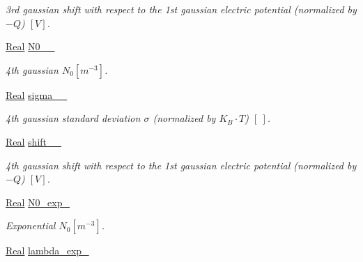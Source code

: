 \begin{DoxyCompactItemize}
\begin{DoxyCompactList}\small\item\em 3rd gaussian shift with respect to the 1st gaussian electric potential (normalized by $ -Q $) $ \left[ V \right] $. \end{DoxyCompactList}\item 
\hypertarget{classParamList_aa65785f19373f13b7b3a5ef53480f3bb}{\hyperlink{typedefs_8h_a060b837c3b4486ee35317744156f3da2}{Real} \hyperlink{classParamList_aa65785f19373f13b7b3a5ef53480f3bb}{N0\-\_\-\_\-}}\label{classParamList_aa65785f19373f13b7b3a5ef53480f3bb}

\begin{DoxyCompactList}\small\item\em 4th gaussian $ N_0 \left[ m^{-3} \right] $. \end{DoxyCompactList}\item 
\hypertarget{classParamList_ae484eb848d5c0716145e00c974ebecca}{\hyperlink{typedefs_8h_a060b837c3b4486ee35317744156f3da2}{Real} \hyperlink{classParamList_ae484eb848d5c0716145e00c974ebecca}{sigma\-\_\-\_\-}}\label{classParamList_ae484eb848d5c0716145e00c974ebecca}

\begin{DoxyCompactList}\small\item\em 4th gaussian standard deviation $ \sigma $ (normalized by $ K_B \cdot T $) $ \left[ ~ \right] $. \end{DoxyCompactList}\item 
\hypertarget{classParamList_a52a824700b094c4d0d908e052989931d}{\hyperlink{typedefs_8h_a060b837c3b4486ee35317744156f3da2}{Real} \hyperlink{classParamList_a52a824700b094c4d0d908e052989931d}{shift\-\_\-\_\-}}\label{classParamList_a52a824700b094c4d0d908e052989931d}

\begin{DoxyCompactList}\small\item\em 4th gaussian shift with respect to the 1st gaussian electric potential (normalized by $ -Q $) $ \left[ V \right] $. \end{DoxyCompactList}\item 
\hypertarget{classParamList_ae7b7161db305f26c559d3f84bfaf5881}{\hyperlink{typedefs_8h_a060b837c3b4486ee35317744156f3da2}{Real} \hyperlink{classParamList_ae7b7161db305f26c559d3f84bfaf5881}{N0\-\_\-exp\-\_\-}}\label{classParamList_ae7b7161db305f26c559d3f84bfaf5881}

\begin{DoxyCompactList}\small\item\em Exponential $ N_0 \left[ m^{-3} \right] $. \end{DoxyCompactList}\item 
\hypertarget{classParamList_a3a463067804bd2f46f24a111b172dc0f}{\hyperlink{typedefs_8h_a060b837c3b4486ee35317744156f3da2}{Real} \hyperlink{classParamList_a3a463067804bd2f46f24a111b172dc0f}{lambda\-\_\-exp\-\_\-}}\label{classParamList_a3a463067804bd2f46f24a111b172dc0f}


\end{DoxyCompactItemize}
